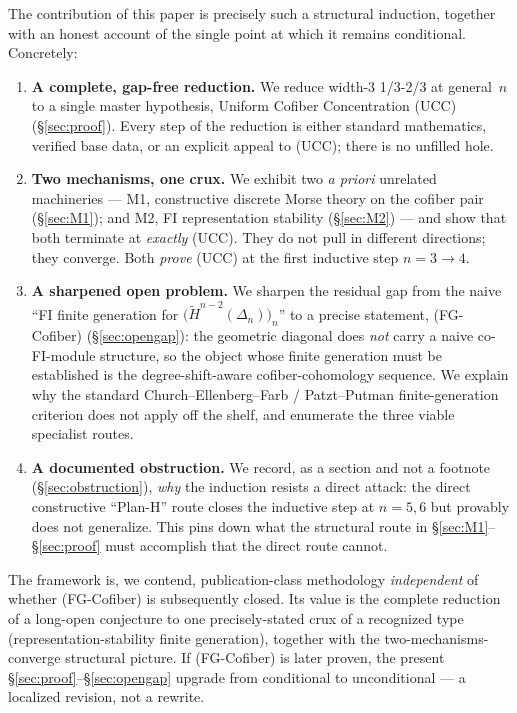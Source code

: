 \documentclass[11pt,reqno]{amsart}
\theoremstyle{plain}
\theoremstyle{definition}
\newcommand{\Hred}{\widetilde H}
\newcommand{\UCC}{\textup{(UCC)}}
\newcommand{\FGC}{\textup{(FG-Cofiber)}}
\begin{document}
The contribution of this paper is precisely such a structural
induction, together with an honest account of the single point at which
it remains conditional. Concretely:
\begin{enumerate}[leftmargin=2em,label=(\arabic*)]
  \item \textbf{A complete, gap-free reduction.} We reduce width-3
        1/3-2/3 at general~$n$ to a single master hypothesis, Uniform
        Cofiber Concentration \UCC{} (\S\ref{sec:proof}). Every step of
        the reduction is either standard mathematics, verified base
        data, or an explicit appeal to \UCC; there is no unfilled hole.
  \item \textbf{Two mechanisms, one crux.} We exhibit two
        \emph{a priori} unrelated machineries --- M1, constructive
        discrete Morse theory on the cofiber pair
        (\S\ref{sec:M1}); and M2, FI representation stability
        (\S\ref{sec:M2}) --- and show that both terminate at
        \emph{exactly} \UCC. They do not pull in different directions;
        they converge. Both \emph{prove} \UCC{} at the first inductive
        step $n=3\to4$.
  \item \textbf{A sharpened open problem.} We sharpen the residual
        gap from the naive ``FI finite generation for
        $\bigl(\Hred^{n-2}(\Delta_n)\bigr)_n$'' to a precise
        statement, \FGC{} (\S\ref{sec:opengap}): the geometric diagonal
        does \emph{not} carry a naive co-FI-module structure, so the
        object whose finite generation must be established is the
        degree-shift-aware cofiber-cohomology sequence. We explain why
        the standard Church--Ellenberg--Farb / Patzt--Putman
        finite-generation criterion does not apply off the shelf, and
        enumerate the three viable specialist routes.
  \item \textbf{A documented obstruction.} We record, as a section and
        not a footnote (\S\ref{sec:obstruction}), \emph{why} the
        induction resists a direct attack: the direct constructive
        ``Plan-H'' route closes the inductive step at $n=5,6$ but
        provably does not generalize. This pins down what the structural
        route in \S\ref{sec:M1}--\S\ref{sec:proof} must accomplish that
        the direct route cannot.
\end{enumerate}

The framework is, we contend, publication-class methodology
\emph{independent} of whether \FGC{} is subsequently closed. Its value
is the complete reduction of a long-open conjecture to one
precisely-stated crux of a recognized type
(representation-stability finite generation), together with the
two-mechanisms-converge structural picture. If \FGC{} is later proven,
the present \S\ref{sec:proof}--\S\ref{sec:opengap} upgrade from
conditional to unconditional --- a localized revision, not a rewrite.
\end{document}
